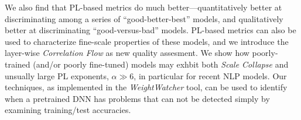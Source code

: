 We also find that PL-based metrics do much better---quantitatively better at discriminating among a series of ``good-better-best'' models, and qualitatively better at discriminating ``good-versus-bad'' models.
PL-based metrics can also be used to characterize fine-scale properties of these models, and we introduce the layer-wise \emph{Correlation Flow} as new quality assesment.
We show how poorly-trained (and/or poorly fine-tuned) models may exhbit both \emph{Scale Collapse} and unsually large PL exponents, $\alpha\gg 6$, in particular for recent NLP models.
Our techniques, as implemented in the \emph{WeightWatcher} tool, can be used to identify when a pretrained DNN has problems that can not be detected simply by examining training/test accuracies.


